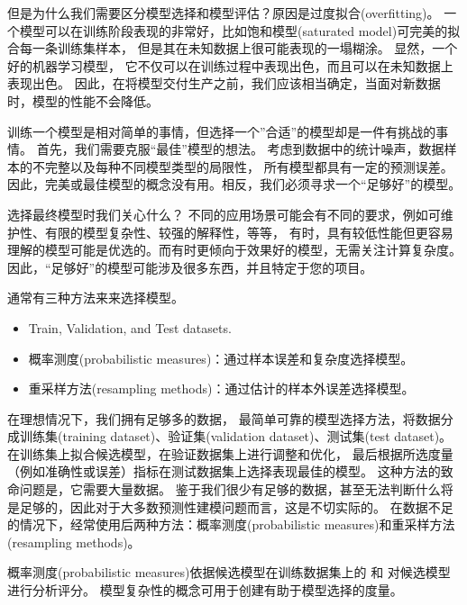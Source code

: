 \documentclass[letterpaper,10pt,english]{sphinxmanual}
\begin{document}
但是为什么我们需要区分模型选择和模型评估？原因是过度拟合(overfitting)。
一个模型可以在训练阶段表现的非常好，比如饱和模型(saturated model)可完美的拟合每一条训练集样本，
但是其在未知数据上很可能表现的一塌糊涂。
显然，一个好的机器学习模型，
它不仅可以在训练过程中表现出色，而且可以在未知数据上表现出色。
因此，在将模型交付生产之前，我们应该相当确定，当面对新数据时，模型的性能不会降低。

训练一个模型是相对简单的事情，但选择一个”合适”的模型却是一件有挑战的事情。
首先，我们需要克服“最佳”模型的想法。
考虑到数据中的统计噪声，数据样本的不完整以及每种不同模型类型的局限性，
所有模型都具有一定的预测误差。
因此，完美或最佳模型的概念没有用。相反，我们必须寻求一个“足够好”的模型。

选择最终模型时我们关心什么？
不同的应用场景可能会有不同的要求，例如可维护性、有限的模型复杂性、较强的解释性，等等，
有时，具有较低性能但更容易理解的模型可能是优选的。而有时更倾向于效果好的模型，无需关注计算复杂度。
因此，“足够好”的模型可能涉及很多东西，并且特定于您的项目。

通常有三种方法来来选择模型。
\begin{itemize}
\item {} 
Train, Validation, and Test datasets.

\item {} 
概率测度(probabilistic measures)：通过样本误差和复杂度选择模型。

\item {} 
重采样方法(resampling methods)：通过估计的样本外误差选择模型。

\end{itemize}

在理想情况下，我们拥有足够多的数据，
最简单可靠的模型选择方法，将数据分成训练集(training dataset)、验证集(validation dataset)、测试集(test dataset)。
在训练集上拟合候选模型，在验证数据集上进行调整和优化，
最后根据所选度量（例如准确性或误差）指标在测试数据集上选择表现最佳的模型。
这种方法的致命问题是，它需要大量数据。
鉴于我们很少有足够的数据，甚至无法判断什么将是足够的，因此对于大多数预测性建模问题而言，这是不切实际的。
在数据不足的情况下，经常使用后两种方法：概率测度(probabilistic measures)和重采样方法(resampling methods)。


概率测度(probabilistic measures)依据候选模型在训练数据集上的  和
 对候选模型进行分析评分。
模型复杂性的概念可用于创建有助于模型选择的度量。
\end{document}

